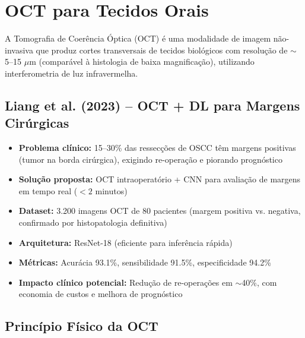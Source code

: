 
\section{OCT para Tecidos Orais}
\label{sec:oct-oral}

A Tomografia de Coerência Óptica (OCT) é uma modalidade de imagem não-invasiva
que produz cortes transversais de tecidos biológicos com resolução de $\sim$5--15
$\mu$m (comparável à histologia de baixa magnificação), utilizando interferometria
de luz infravermelha.

\subsection{Liang et al. (2023) -- OCT + DL para Margens Cirúrgicas}

\begin{itemize}
  \item \textbf{Problema clínico:} 15--30\% das ressecções de OSCC têm margens
        positivas (tumor na borda cirúrgica), exigindo re-operação e piorando
        prognóstico
  \item \textbf{Solução proposta:} OCT intraoperatório + CNN para avaliação de
        margens em tempo real ($< 2$ minutos)
  \item \textbf{Dataset:} 3.200 imagens OCT de 80 pacientes (margem positiva vs.
        negativa, confirmado por histopatologia definitiva)
  \item \textbf{Arquitetura:} ResNet-18 (eficiente para inferência rápida)
  \item \textbf{Métricas:} Acurácia 93.1\%, sensibilidade 91.5\%, especificidade 94.2\%
  \item \textbf{Impacto clínico potencial:} Redução de re-operações em $\sim$40\%,
        com economia de custos e melhora de prognóstico
\end{itemize}

\subsection{Princípio Físico da OCT}

